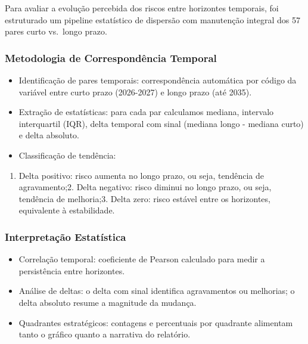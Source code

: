\documentclass[
  portuguese,
  letterpaper,
  DIV=11,
  numbers=noendperiod]{scrreprt}
\providecommand{\tightlist}{%
  \setlength{\itemsep}{0pt}\setlength{\parskip}{0pt}}
\begin{document}
Para avaliar a evolução percebida dos riscos entre horizontes temporais,
foi estruturado um pipeline estatístico de dispersão com manutenção
integral dos 57 pares curto vs.~longo prazo.

\subsubsection{Metodologia de Correspondência
Temporal}\label{metodologia-de-corresponduxeancia-temporal}

\begin{itemize}
\tightlist
\item
  Identificação de pares temporais: correspondência automática por
  código da variável entre curto prazo (2026-2027) e longo prazo (até
  2035).
\item
  Extração de estatísticas: para cada par calculamos mediana, intervalo
  interquartil (IQR), delta temporal com sinal (mediana longo - mediana
  curto) e delta absoluto.
\item
  Classificação de tendência:
\end{itemize}

\begin{enumerate}
\def\labelenumi{\arabic{enumi}.}
\tightlist
\item
  Delta positivo: risco aumenta no longo prazo, ou seja, tendência de
  agravamento;2. Delta negativo: risco diminui no longo prazo, ou seja,
  tendência de melhoria;3. Delta zero: risco estável entre os
  horizontes, equivalente à estabilidade.
\end{enumerate}

\subsubsection{Interpretação
Estatística}\label{interpretauxe7uxe3o-estatuxedstica}

\begin{itemize}
\tightlist
\item
  Correlação temporal: coeficiente de Pearson calculado para medir a
  persistência entre horizontes.
\item
  Análise de deltas: o delta com sinal identifica agravamentos ou
  melhorias; o delta absoluto resume a magnitude da mudança.
\item
  Quadrantes estratégicos: contagens e percentuais por quadrante
  alimentam tanto o gráfico quanto a narrativa do relatório.
\end{itemize}
\end{document}
